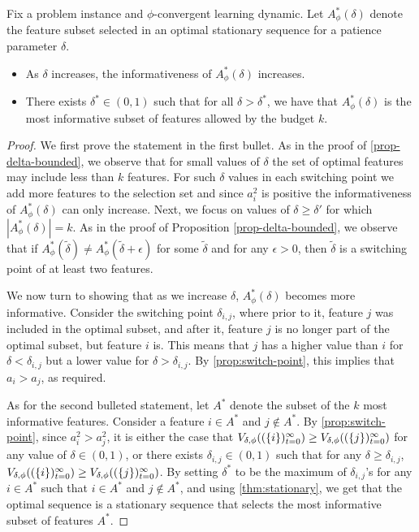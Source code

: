 \begin{theorem} \label{prop-delta-efficient} 
    Fix a problem instance and $\phi$-convergent learning dynamic. Let $A_\phi^*(\delta)$ denote the feature subset selected in an optimal stationary sequence for a patience parameter $\delta$. 
    \begin{itemize}
        \item As $\delta$ increases, the informativeness of $A_\phi^*(\delta)$  increases.
        \item There exists  $\delta^* \in (0,1)$ such that for all $\delta > \delta^*$, we have that $A_\phi^*(\delta)$ is the most informative subset of features allowed by the budget $k$. 
    \end{itemize}
\end{theorem}


\begin{proof}
We first prove the statement in the first bullet. As in the proof of \cref{prop-delta-bounded}, we observe that for small values of \( \delta \) the set of optimal features may include less than $k$ features. For such $\delta$ values in each switching point we add more features to the selection set and since $a_i^2$ is positive the informativeness of \( A_\phi^*(\delta) \) can only increase. 
%
Next, we focus on values of \( \delta \geq \delta' \) for which \( |A_\phi^*(\delta)| = k \). As in the proof of Proposition \ref{prop-delta-bounded}, we observe that if \( A_\phi^*(\tilde \delta) \neq A_\phi^*(\tilde \delta+\epsilon) \) for some $\tilde\delta$ and for any \( \epsilon > 0 \), then  \( \tilde \delta \) is a switching point of at least two features.

We now turn to showing that as we increase $\delta$, $A_\phi^*(\delta)$ becomes more informative. Consider the switching point $\delta_{i,j}$, where prior to it, feature $j$ was included in the optimal subset, and after it, feature $j$ is no longer part of the optimal subset, but feature $i$ is. This means that $j$ has a higher value than $i$ for $\delta < \delta_{i,j}$ but a lower value for $\delta > \delta_{i,j}$. By \cref{prop:switch-point}, this implies that $a_i > a_j$, as required.  

As for the second bulleted statement, let $A^*$ denote the subset of the $k$ most informative features. Consider a feature $i\in A^*$ and $j \not\in A^*$. By \cref{prop:switch-point}, since $a^2_i>a^2_j$, it is either the case that $V_{\delta,\phi}((\{i\})_{t=0}^\infty) \geq V_{\delta,\phi}((\{j\})_{t=0}^\infty)$ for any value of $\delta \in (0,1)$, or there exists $\delta_{i,j} \in (0,1)$ such that for any $\delta \geq \delta_{i,j}$, $V_{\delta,\phi}((\{i\})_{t=0}^\infty) \geq V_{\delta,\phi}((\{j\})_{t=0}^\infty)$. By setting $\delta^*$ to be the maximum of $\delta_{i,j}$'s for any $i\in A^*$ such that $i\in A^*$ and $j \not \in A^*$, and using \cref{thm:stationary}, we get that the optimal sequence is a stationary sequence that selects the most informative subset of features $A^*$.

\end{proof}


